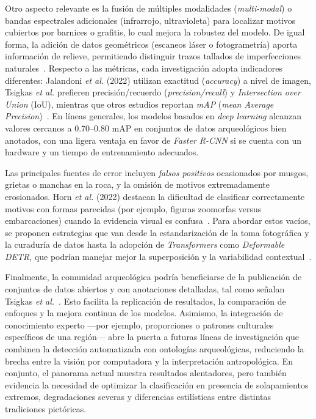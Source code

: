 Otro aspecto relevante es la fusión de múltiples modalidades (\textit{multi-modal}) o bandas espectrales adicionales (infrarrojo, ultravioleta) para localizar motivos cubiertos por barnices o grafitis, lo cual mejora la robustez del modelo. De igual forma, la adición de datos geométricos (escaneos láser o fotogrametría) aporta información de relieve, permitiendo distinguir trazos tallados de imperfecciones naturales~\cite{horn2022}. Respecto a las métricas, cada investigación adopta indicadores diferentes: Jalandoni \textit{et al.} (2022) utilizan exactitud (\textit{accuracy}) a nivel de imagen, Tsigkas \textit{et al.} prefieren precisión/recuerdo (\textit{precision/recall}) y \textit{Intersection over Union} (IoU), mientras que otros estudios reportan \textit{mAP} (\textit{mean Average Precision})~\cite{jalandoni2022,tsigkas2020,davis2021}. En líneas generales, los modelos basados en \textit{deep learning} alcanzan valores cercanos a 0.70–0.80 mAP en conjuntos de datos arqueológicos bien anotados, con una ligera ventaja en favor de \textit{Faster R-CNN} si se cuenta con un hardware y un tiempo de entrenamiento adecuados.

Las principales fuentes de error incluyen \emph{falsos positivos} ocasionados por musgos, grietas o manchas en la roca, y la omisión de motivos extremadamente erosionados. Horn \textit{et al.} (2022) destacan la dificultad de clasificar correctamente motivos con formas parecidas (por ejemplo, figuras zoomorfas versus embarcaciones) cuando la evidencia visual es confusa~\cite{horn2022}. Para abordar estos vacíos, se proponen estrategias que van desde la estandarización de la toma fotográfica y la curaduría de datos hasta la adopción de \textit{Transformers} como \textit{Deformable DETR}, que podrían manejar mejor la superposición y la variabilidad contextual~\cite{zhu2021}.

Finalmente, la comunidad arqueológica podría beneficiarse de la publicación de conjuntos de datos abiertos y con anotaciones detalladas, tal como señalan Tsigkas \textit{et al.}~\cite{tsigkas2020}. Esto facilita la replicación de resultados, la comparación de enfoques y la mejora continua de los modelos. Asimismo, la integración de conocimiento experto —por ejemplo, proporciones o patrones culturales específicos de una región— abre la puerta a futuras líneas de investigación que combinen la detección automatizada con ontologías arqueológicas, reduciendo la brecha entre la visión por computadora y la interpretación antropológica. En conjunto, el panorama actual muestra resultados alentadores, pero también evidencia la necesidad de optimizar la clasificación en presencia de solapamientos extremos, degradaciones severas y diferencias estilísticas entre distintas tradiciones pictóricas.

